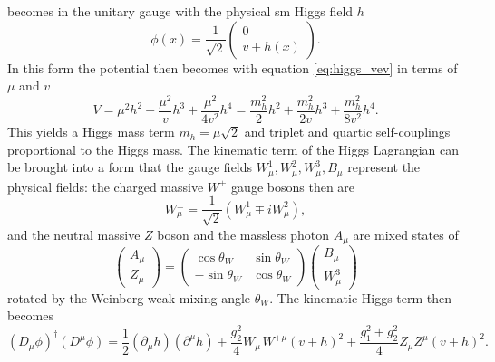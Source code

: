 becomes in the unitary gauge with the physical \ac{sm} Higgs field $h$
\begin{equation}
    \phi(x)=\frac{1}{\sqrt{2}}
    \begin{pmatrix}
        0 \\
        v+h(x)
    \end{pmatrix}.
    \label{eq:unitary_gauge}
\end{equation}
In this form the potential then becomes with equation \ref{eq:higgs_vev} in terms of $\mu$ and $v$
\begin{equation}
    V=\mu^2h^2+\frac{\mu^2}{v}h^3+\frac{\mu^2}{4v^2}h^4
    =
    \frac{m_h^2}{2}h^2+\frac{m_h^2}{2v}h^3+\frac{m_h^2}{8v^2}h^4.
    \label{eq:higgs_potential}
\end{equation}
This yields a Higgs mass term $m_h=\mu\sqrt{2}$ and triplet and quartic self-couplings proportional to the Higgs mass. The kinematic term of the Higgs Lagrangian can be brought into a form that the gauge fields $W^1_\mu,W^2_\mu,W^3_\mu,B_\mu$ represent the physical fields: the charged massive $W^{\pm}$ gauge bosons then are
\begin{equation}
    W_\mu^\pm = \frac{1}{\sqrt{2}}(W_\mu^1\mp i W_\mu^2),
\end{equation}
and the neutral massive $Z$ boson and the massless photon $A_\mu$ are mixed states of
\begin{equation}
    \begin{pmatrix}
        A_\mu \\
        Z_\mu
    \end{pmatrix}
    =
    \begin{pmatrix}
        \cos\theta_W  & \sin\theta_W \\
        -\sin\theta_W & \cos\theta_W
    \end{pmatrix}
    \begin{pmatrix}
        B_\mu \\
        W^3_\mu
    \end{pmatrix}
\end{equation}
rotated by the Weinberg weak mixing angle $\theta_W$. The kinematic Higgs term then becomes
\begin{equation}
    \left(D_\mu\phi\right)^\dagger (D^\mu\phi )=
    \frac{1}{2}(\partial_\mu h)(\partial^\mu h)+
    \frac{g_2^2}{4}W^-_\mu W^{+\mu}(v+h)^2+
    \frac{g_1^2+g_2^2}{4} Z_\mu Z^\mu(v+h)^2.
    \label{eq:higgs_kinematic}
\end{equation}
